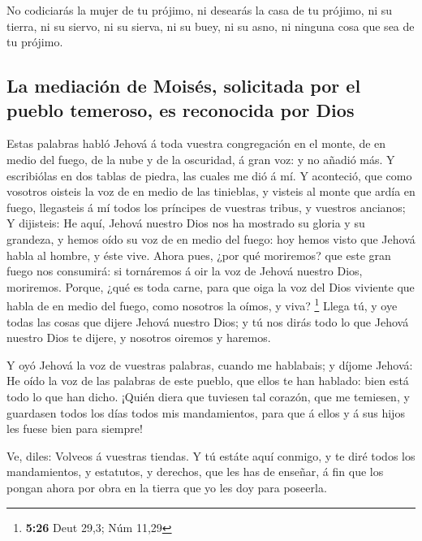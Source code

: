  No codiciarás la mujer de tu prójimo, ni desearás la
casa de tu prójimo, ni su tierra, ni su siervo, ni su sierva, ni su
buey, ni su asno, ni ninguna cosa que sea de tu prójimo.

\hypertarget{la-mediaciuxf3n-de-moisuxe9s-solicitada-por-el-pueblo-temeroso-es-reconocida-por-dios}{%
\subsection{La mediación de Moisés, solicitada por el pueblo temeroso,
es reconocida por
Dios}\label{la-mediaciuxf3n-de-moisuxe9s-solicitada-por-el-pueblo-temeroso-es-reconocida-por-dios}}

 Estas palabras habló Jehová á toda vuestra congregación
en el monte, de en medio del fuego, de la nube y de la oscuridad, á gran
voz: y no añadió más. Y escribiólas en dos tablas de piedra, las cuales
me dió á mí.  Y aconteció, que como vosotros oisteis la
voz de en medio de las tinieblas, y visteis al monte que ardía en fuego,
llegasteis á mí todos los príncipes de vuestras tribus, y vuestros
ancianos;  Y dijisteis: He aquí, Jehová nuestro Dios nos
ha mostrado su gloria y su grandeza, y hemos oído su voz de en medio del
fuego: hoy hemos visto que Jehová habla al hombre, y éste vive.
 Ahora pues, ¿por qué moriremos? que este gran fuego nos
consumirá: si tornáremos á oir la voz de Jehová nuestro Dios, moriremos.
 Porque, ¿qué es toda carne, para que oiga la voz del
Dios viviente que habla de en medio del fuego, como nosotros la oímos, y
viva? \footnote{\textbf{5:26} Deut 29,3; Núm 11,29} 
Llega tú, y oye todas las cosas que dijere Jehová nuestro Dios; y tú nos
dirás todo lo que Jehová nuestro Dios te dijere, y nosotros oiremos y
haremos.

 Y oyó Jehová la voz de vuestras palabras, cuando me
hablabais; y díjome Jehová: He oído la voz de las palabras de este
pueblo, que ellos te han hablado: bien está todo lo que han dicho.
 ¡Quién diera que tuviesen tal corazón, que me temiesen,
y guardasen todos los días todos mis mandamientos, para que á ellos y á
sus hijos les fuese bien para siempre!

 Ve, diles: Volveos á vuestras tiendas.  Y
tú estáte aquí conmigo, y te diré todos los mandamientos, y estatutos, y
derechos, que les has de enseñar, á fin que los pongan ahora por obra en
la tierra que yo les doy para poseerla.

